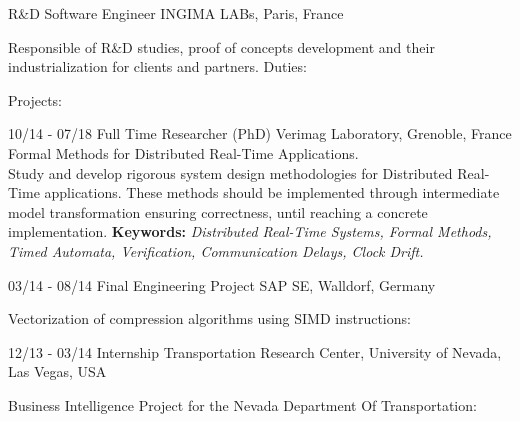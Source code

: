 \documentclass[]{friggeri-cv}
\begin{document}
\begin{entrylist}
    {R\&D Software Engineer}
    {INGIMA LABs, Paris, France}
    {Responsible of R\&D studies, proof of concepts development and their industrialization for clients and partners. Duties:
        \begin{itemize}
        \end{itemize}
        Projects:
        \begin{itemize}
        \end{itemize}
    }
  \entry
    {10/14 - 07/18}
    {Full Time Researcher (PhD)}
    {Verimag Laboratory, Grenoble, France}
    {Formal Methods for Distributed Real-Time Applications.\\
    Study and develop rigorous system design methodologies for Distributed Real-Time applications. These methods should be implemented through intermediate model transformation
    ensuring correctness, until reaching a concrete implementation.
    \newline \textbf{Keywords:} \emph{Distributed Real-Time Systems, Formal Methods, Timed Automata, Verification, Communication Delays, Clock Drift.}\\
  }

  \entry
    {03/14 - 08/14}
    {Final Engineering Project}
    {SAP SE, Walldorf, Germany}
    {Vectorization of compression algorithms using SIMD instructions:
        \begin{itemize}
        \end{itemize}
    }
\end{entrylist}
\newpage
\makeprofile
\begin{entrylist}
  \entry
    {12/13 - 03/14}
    {Internship}
    {Transportation Research Center, University of Nevada, Las Vegas, USA}
    {Business Intelligence Project for the Nevada Department Of Transportation:
        \begin{itemize}
        \end{itemize}
    }
   
\end{entrylist}
\end{document}
